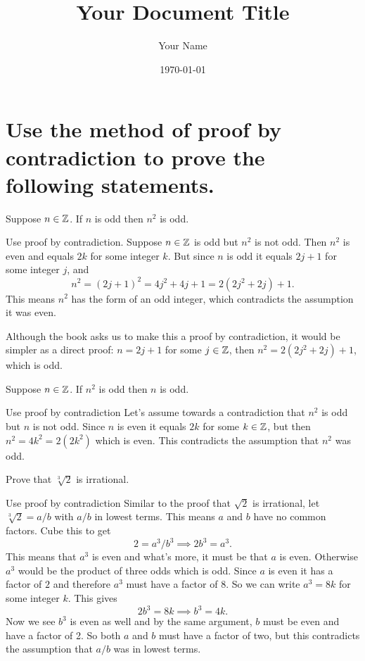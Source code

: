 \documentclass{article}
\title{Your Document Title}
\author{Your Name}
\date{\today} %
\begin{document}
\maketitle

\section{Use the method of proof by contradiction to prove the following statements.}

\begin{problem}
Suppose $n \in \mathbb{Z}$. If $n$ is odd then $n^2$ is odd.
\end{problem}

\begin{solution}{Use proof by contradiction.}
    Suppose $n \in \mathbb{Z}$ is odd but $n^2$ is not odd. Then $n^2$ is even and equals $2k$ for some integer $k$. But since $n$ is odd it equals $2j + 1$ for some integer $j$, and
    $$n^2 = (2j + 1)^2 = 4j^2 + 4j + 1 = 2(2j^2 + 2j) + 1.$$
    This means $n^2$ has the form of an odd integer, which contradicts the assumption it was even.

    Although the book asks us to make this a proof by contradiction, it would be simpler as a direct proof: $n = 2j + 1$ for some $j \in \mathbb{Z}$, then $n^2 = 2(2j^2 + 2j) + 1$, which is odd.
\end{solution}

\begin{problem}
    Suppose $n \in \mathbb{Z}$. If $n^2$ is odd then $n$ is odd.
\end{problem}

\begin{solution}{Use proof by contradiction}
    Let's assume towards a contradiction that $n^2$ is odd but $n$ is not odd. Since $n$ is even it equals $2k$ for some $k \in \mathbb{Z}$, but then $n^2 = 4k^2 = 2(2k^2)$ which is even. This contradicts the assumption that $n^2$ was odd.
\end{solution}

\begin{problem}
    Prove that $\sqrt[3]{2}$ is irrational.
\end{problem}

\begin{solution}{Use proof by contradiction}
    Similar to the proof that $\sqrt{2}$ is irrational, let $\sqrt[3]{2} = a/b$ with $a/b$ in lowest terms. This means $a$ and $b$ have no common factors. Cube this to get 
    $$2 = a^3 / b^3 \implies 2b^3 = a^3.$$
    This means that $a^3$ is even and what's more, it must be that $a$ is even. Otherwise $a^3$ would be the product of three odds which is odd. Since $a$ is even it has a factor of $2$ and therefore $a^3$ must have a factor of 8. So we can write $a^3 = 8k$ for some integer $k$. This gives
    $$2b^3 = 8k \implies b^3 = 4k.$$
    Now we see $b^3$ is even as well and by the same argument, $b$ must be even and have a factor of 2. So both $a$ and $b$ must have a factor of two, but this contradicts the assumption that $a/b$ was in lowest terms.
\end{solution}
\end{document}
